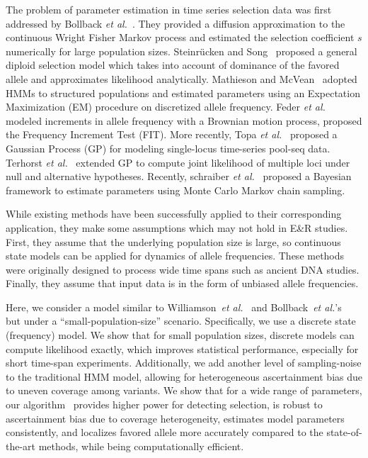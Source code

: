 
The problem of parameter estimation in time series selection data was
first addressed by Bollback \emph{et
  al.}~\cite{bollback2008estimation}.  They provided a diffusion
approximation to the continuous Wright Fisher Markov process and
estimated the selection coefficient $s$ numerically for large
population sizes.  Steinr\"{u}cken and
Song~\cite{steinrucken2014novel} proposed a general diploid selection
model which takes into account of dominance of the favored allele and
approximates likelihood analytically.  Mathieson and
McVean~\cite{mathieson2013estimating} adopted HMMs to structured
populations and estimated parameters using an Expectation Maximization
(EM) procedure on discretized allele frequency.  Feder \emph{et
  al.}~\cite{feder2014Identifying} modeled increments in allele
frequency with a Brownian motion process, proposed the Frequency
Increment Test (FIT). More recently, Topa \emph{et
  al.}~\cite{topa2015gaussian} proposed a Gaussian Process (GP) for
modeling single-locus time-series pool-seq data. Terhorst \emph{et
  al.}~\cite{Terhorst2015Multi} extended GP to compute joint
likelihood of multiple loci under null and alternative hypotheses.
Recently, schraiber \emph{et al.}~\cite{schraiber2016bayesian}
proposed a Bayesian framework to estimate parameters using Monte Carlo
Markov chain sampling.


While existing methods have been successfully applied to their
corresponding application, they make some assumptions which may not
hold in E\&R studies.  First, they assume that the underlying
population size is large, so continuous state models can be applied
for dynamics of allele frequencies.  These methods were originally
designed to process wide time spans such as ancient DNA
studies. Finally, they assume that input data is in the form of
unbiased allele frequencies.

Here, we consider a model similar to Williamson~\emph{et
  al.}~\cite{williamson1999using} and Bollback~\emph{et
  al.}'s~\cite{bollback2008estimation} but under a
``small-population-size'' scenario. Specifically, we use a discrete
state (frequency) model.  We show that for small population sizes,
discrete models can compute likelihood exactly, which improves
statistical performance, especially for short time-span
experiments. Additionally, we add another level of sampling-noise to
the traditional HMM model, allowing for heterogeneous ascertainment
bias due to uneven coverage among variants. We show that for a wide
range of parameters, our algorithm \comale\ provides higher power for
detecting selection, is robust to ascertainment bias due to coverage
heterogeneity, estimates model parameters consistently, and localizes
favored allele more accurately compared to the state-of-the-art
methods, while being computationally efficient.
